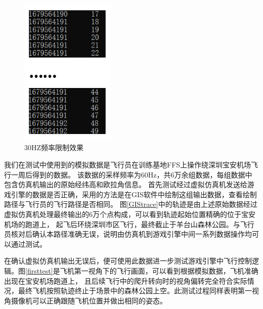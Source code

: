 \begin{figure}[h!]
    \begin{center}
        \includegraphics[width=0.4\textwidth]{pictures/frame.png}
        \caption{30HZ频率限制效果}
        \label{synctest}
    \end{center}
\end{figure}
\par
我们在测试中使用到的模拟数据是飞行员在训练基地FFS上操作绕深圳宝安机场飞行一周后得到的数据。
该数据的采样频率为60Hz，共6万余组数据，每组数据中包含仿真机输出的原始经纬高和欧拉角信息。
首先测试经过虚拟仿真机发送给游戏引擎的数据是否正确，采用的方法是在GIS软件中绘制这组输出数据，查看绘制路径与飞行员的飞行路径是否相同。
图\ref{GIStrace}中的轨迹是由上述原始数据经过虚拟仿真机处理最终输出的6万个点构成，可以看到轨迹起始位置精确的位于宝安机场的跑道上，
起飞后环绕深圳市区飞行，最终截止于羊台山森林公园。与飞行员核对后确认本路径准确无误，说明由仿真机到游戏引擎中间一系列数据操作均可以通过测试。

\par
在确认虚拟仿真机输出无误后，便可使用此数据进一步测试游戏引擎中飞行控制逻辑。图\ref{firsttest}是飞机第一视角下的飞行画面，可以看到根据模拟数据，飞机准确出现在宝安机场跑道上，
且后续飞行中的爬升转向时的视角偏转完全符合实际情况，最终飞机按照轨迹终止于场景中的森林公园上空。此测试过程同样表明第一视角摄像机可以正确跟随飞机位置并做出相同的姿态。

